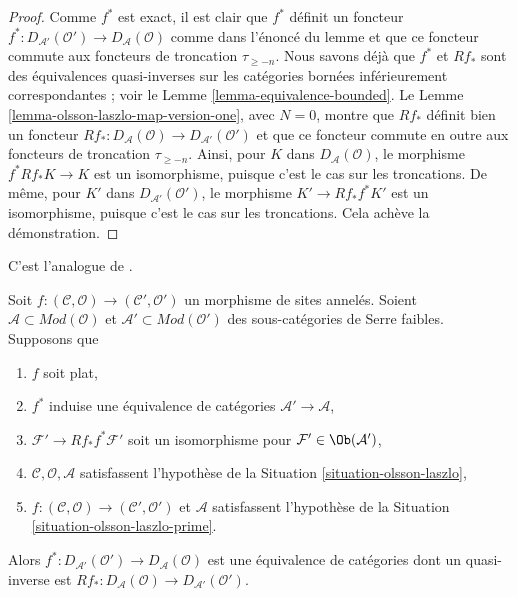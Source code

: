 \begin{proof}
Comme $f^*$ est exact, il est clair que $f^*$ définit un foncteur
$f^* : D_{\mathcal{A}'}(\mathcal{O}') \to D_\mathcal{A}(\mathcal{O})$
comme dans l'énoncé du lemme et que ce foncteur commute aux foncteurs de
troncation $\tau_{\geq -n}$. Nous savons déjà que $f^*$ et $Rf_*$ sont des
équivalences quasi-inverses sur les catégories bornées inférieurement
correspondantes ; voir le Lemme \ref{lemma-equivalence-bounded}. Le Lemme
\ref{lemma-olsson-laszlo-map-version-one}, avec $N = 0$, montre que $Rf_*$
définit bien un foncteur
$Rf_* : D_\mathcal{A}(\mathcal{O}) \to D_{\mathcal{A}'}(\mathcal{O}')$
et que ce foncteur commute en outre aux foncteurs de troncation
$\tau_{\geq -n}$. Ainsi, pour $K$ dans $D_\mathcal{A}(\mathcal{O})$, le
morphisme $f^*Rf_*K \to K$ est un isomorphisme, puisque c'est le cas sur
les troncations. De même, pour $K'$ dans
$D_{\mathcal{A}'}(\mathcal{O}')$, le morphisme $K' \to Rf_*f^*K'$ est un
isomorphisme, puisque c'est le cas sur les troncations. Cela achève la
démonstration.
\end{proof}

\begin{lemma}
\label{lemma-equivalence-unbounded-two}
\begin{reference}
C'est l'analogue de \cite[Theorem 2.2.3]{six-I}.
\end{reference}
Soit $f : (\mathcal{C}, \mathcal{O}) \to (\mathcal{C}', \mathcal{O}')$ un
morphisme de sites annelés. Soient
$\mathcal{A} \subset \textit{Mod}(\mathcal{O})$ et
$\mathcal{A}' \subset \textit{Mod}(\mathcal{O}')$ des sous-catégories de
Serre faibles. Supposons que
\begin{enumerate}
\item $f$ soit plat,
\item $f^*$ induise une équivalence de catégories
$\mathcal{A}' \to \mathcal{A}$,
\item $\mathcal{F}' \to Rf_*f^*\mathcal{F}'$ soit un isomorphisme pour
$\mathcal{F}' \in \Ob(\mathcal{A}')$,
\item $\mathcal{C}, \mathcal{O}, \mathcal{A}$ satisfassent l'hypothèse de
la Situation \ref{situation-olsson-laszlo},
\item $f : (\mathcal{C}, \mathcal{O}) \to (\mathcal{C}', \mathcal{O}')$
et $\mathcal{A}$ satisfassent l'hypothèse de la Situation
\ref{situation-olsson-laszlo-prime}.
\end{enumerate}
Alors $f^* : D_{\mathcal{A}'}(\mathcal{O}') \to D_\mathcal{A}(\mathcal{O})$
est une équivalence de catégories dont un quasi-inverse est
$Rf_* : D_\mathcal{A}(\mathcal{O}) \to D_{\mathcal{A}'}(\mathcal{O}')$.
\end{lemma}

